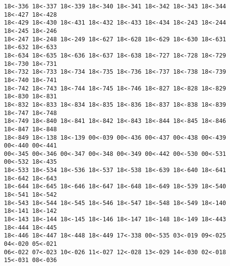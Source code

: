 \documentclass{concdistfoils}
\begin{document}
\begin{slide}
\begin{note}
\begin{verbatim}
18<-336 18<-337 18<-339 18<-340 18<-341 18<-342 18<-343 18<-344 18<-427 18<-428
18<-429 18<-430 18<-431 18<-432 18<-433 18<-434 18<-243 18<-244 18<-245 18<-246
18<-247 18<-248 18<-249 18<-627 18<-628 18<-629 18<-630 18<-631 18<-632 18<-633
18<-634 18<-635 18<-636 18<-637 18<-638 18<-727 18<-728 18<-729 18<-730 18<-731
18<-732 18<-733 18<-734 18<-735 18<-736 18<-737 18<-738 18<-739 18<-740 18<-741
18<-742 18<-743 18<-744 18<-745 18<-746 18<-827 18<-828 18<-829 18<-830 18<-831
18<-832 18<-833 18<-834 18<-835 18<-836 18<-837 18<-838 18<-839 18<-747 18<-748
18<-749 18<-840 18<-841 18<-842 18<-843 18<-844 18<-845 18<-846 18<-847 18<-848
18<-849 18<-138 18<-139 00<-039 00<-436 00<-437 00<-438 00<-439 00<-440 00<-441
00<-345 00<-346 00<-347 00<-348 00<-349 00<-442 00<-530 00<-531 00<-532 18<-435
18<-533 18<-534 18<-536 18<-537 18<-538 18<-639 18<-640 18<-641 18<-642 18<-643
18<-644 18<-645 18<-646 18<-647 18<-648 18<-649 18<-539 18<-540 18<-541 18<-542
18<-543 18<-544 18<-545 18<-546 18<-547 18<-548 18<-549 18<-140 18<-141 18<-142
18<-143 18<-144 18<-145 18<-146 18<-147 18<-148 18<-149 18<-443 18<-444 18<-445
18<-446 18<-447 18<-448 18<-449 17<-338 00<-535 03<-019 09<-025 04<-020 05<-021
06<-022 07<-023 10<-026 11<-027 12<-028 13<-029 14<-030 02<-018 15<-031 08<-036
\end{verbatim}


\end{note}
\end{slide}
\end{document}
